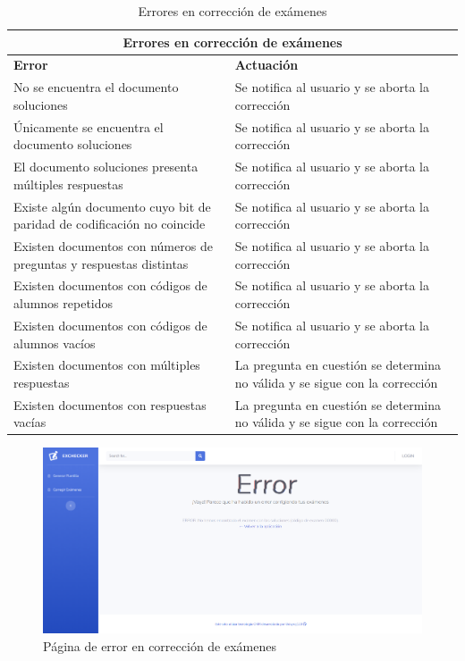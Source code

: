 \documentclass[a4paper, 12pt]{book}
\begin{document}
\begin{table}[h]
  \begin{center}
    \begin{tabular}{ | p{7cm} | p{7cm} |}
      \hline
      \multicolumn{2}{|c|}{\textbf{Errores en corrección de exámenes}} \\
      \hline
      \centering \textbf{Error} & \centering \textbf{Actuación} \tabularnewline
      \hline
      \centering No se encuentra el documento soluciones &
      \centering Se notifica al usuario y se aborta la corrección \tabularnewline
      \hline
      \centering Únicamente se encuentra el documento soluciones &
      \centering Se notifica al usuario y se aborta la corrección \tabularnewline
      \hline
      \centering El documento soluciones presenta múltiples respuestas &
      \centering Se notifica al usuario y se aborta la corrección \tabularnewline
      \hline
      \centering Existe algún documento cuyo bit de paridad de codificación no coincide &
      \centering Se notifica al usuario y se aborta la corrección \tabularnewline
      \hline
      \centering Existen documentos con números de preguntas y respuestas distintas &
      \centering Se notifica al usuario y se aborta la corrección \tabularnewline
      \hline
      \centering Existen documentos con códigos de alumnos repetidos &
      \centering Se notifica al usuario y se aborta la corrección \tabularnewline
      \hline
      \centering Existen documentos con códigos de alumnos vacíos &
      \centering Se notifica al usuario y se aborta la corrección \tabularnewline
      \hline
      \centering Existen documentos con múltiples respuestas &
      \centering La pregunta en cuestión se determina no válida y se sigue con la corrección \tabularnewline
      \hline
      \centering Existen documentos con respuestas vacías &
      \centering La pregunta en cuestión se determina no válida y se sigue con la corrección \tabularnewline
      \hline
    \end{tabular}
    \caption{Errores en corrección de exámenes}
    \label{tabla:errores}
  \end{center}
\end{table}

\begin{figure}
  \centering
  \includegraphics[width=12cm, keepaspectratio]{img/error_en_correccion}
  \caption{Página de error en corrección de exámenes}
  \label{figura:error_en_correccion}
\end{figure}
\end{document}
